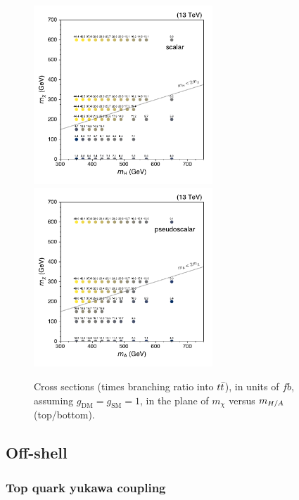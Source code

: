 \begin{figure}[htb!]
    \centering
    \includegraphics[width=0.60\textwidth]{figs/ftan/plot_2d_dmscalar_xsec_totsm} \\
    \includegraphics[width=0.60\textwidth]{figs/ftan/plot_2d_dmpseudo_xsec_totsm}
\caption{Cross sections (times branching ratio into $t\bar{t}$), in units of $\unit{fb}$, assuming
$g_\mathrm{DM}=g_\mathrm{SM}=1$, in the plane of $m_\chi$ versus $m_{H/A}$ (top/bottom).
}
\label{fig:dm_2d_xsecs}
\end{figure}



\FloatBarrier

\subsection{Off-shell}

\subsubsection{Top quark yukawa coupling}
\label{sec:ftyukawa}


